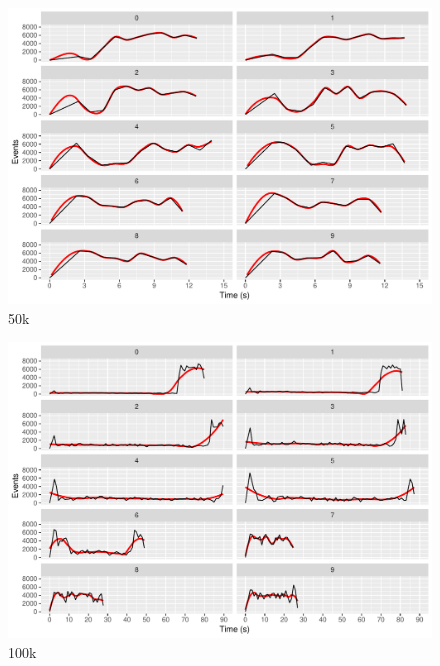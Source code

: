 \begin{figure}[htb]
        \includegraphics[width=\textwidth]{gfx/config-comparison_50k.pdf}
        \caption{50k}
        \label{fig:evaluation:performance:config-comparison_50k}
\end{figure}

\begin{figure}[htb]
        \includegraphics[width=\textwidth]{gfx/config-comparison_100k.pdf}
        \caption{100k}
        \label{fig:evaluation:performance:config-comparison_100k}
\end{figure}

